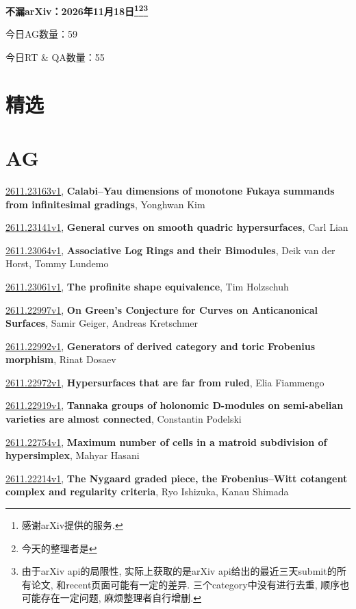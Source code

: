 \documentclass[9pt, a4paper]{article}
\theoremstyle{plain}
\theoremstyle{definition}
\theoremstyle{remark}
\newcommand{\arxiv}[3]{\href{https://arxiv.org/abs/#1}{#1}, \textbf{\textcolor{arxivblue}{#2}}, #3}
\newcommand{\AGnumber}{59}
\newcommand{\RTQAnumber}{55}
\newcommand{\NewestDate}{2026年11月18日}
\newcommand{\todayarXiver}{} %
\begin{document}
\begin{center}
    \Huge\textbf{不漏arXiv：\NewestDate\footnote{感谢arXiv提供的服务.}\footnote{今天的整理者是\todayarXiver}\footnote{由于arXiv api的局限性, 实际上获取的是arXiv api给出的最近三天submit的所有论文, 和recent页面可能有一定的差异. 三个category中没有进行去重, 顺序也可能存在一定问题, 麻烦整理者自行增删.}} \\
\end{center}

\setcounter{section}{-1}

\begin{center}
    今日AG数量：\AGnumber
    
    今日RT \& QA数量：\RTQAnumber
    
\end{center}


\section{精选}


\section{AG}
\arxiv{2611.23163v1}{Calabi--Yau dimensions of monotone Fukaya summands from infinitesimal gradings}{Yonghwan Kim}

\arxiv{2611.23141v1}{General curves on smooth quadric hypersurfaces}{Carl Lian}

\arxiv{2611.23064v1}{Associative Log Rings and their Bimodules}{Deik van der Horst, Tommy Lundemo}

\arxiv{2611.23061v1}{The profinite shape equivalence}{Tim Holzschuh}

\arxiv{2611.22997v1}{On Green's Conjecture for Curves on Anticanonical Surfaces}{Samir Geiger, Andreas Kretschmer}

\arxiv{2611.22992v1}{Generators of derived category and toric Frobenius morphism}{Rinat Dosaev}

\arxiv{2611.22972v1}{Hypersurfaces that are far from ruled}{Elia Fiammengo}

\arxiv{2611.22919v1}{Tannaka groups of holonomic D-modules on semi-abelian varieties are almost connected}{Constantin Podelski}

\arxiv{2611.22754v1}{Maximum number of cells in a matroid subdivision of hypersimplex}{Mahyar Hasani}

\arxiv{2611.22214v1}{The Nygaard graded piece, the Frobenius--Witt cotangent complex and regularity criteria}{Ryo Ishizuka, Kanau Shimada}
\end{document}
